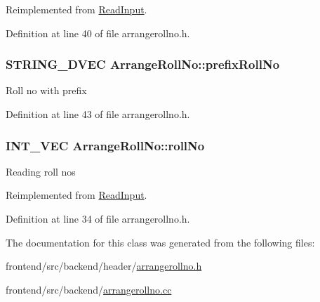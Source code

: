 \-Reimplemented from \hyperlink{classReadInput_a6a96c934f8c9a2a2056dc50505017e52}{\-Read\-Input}.



\-Definition at line 40 of file arrangerollno.\-h.

\hypertarget{classArrangeRollNo_aa0401159b5d59c7afe77980a391a9a0a}{
\subsubsection[{prefix\-Roll\-No}]{\setlength{\rightskip}{0pt plus 5cm}\-S\-T\-R\-I\-N\-G\-\_\-D\-V\-E\-C {\bf \-Arrange\-Roll\-No\-::prefix\-Roll\-No}}}\label{classArrangeRollNo_aa0401159b5d59c7afe77980a391a9a0a}
\-Roll no with prefix 

\-Definition at line 43 of file arrangerollno.\-h.

\hypertarget{classArrangeRollNo_ad75d3ee3f709606da5b4871098c3e978}{
\subsubsection[{roll\-No}]{\setlength{\rightskip}{0pt plus 5cm}\-I\-N\-T\-\_\-\-V\-E\-C {\bf \-Arrange\-Roll\-No\-::roll\-No}}}\label{classArrangeRollNo_ad75d3ee3f709606da5b4871098c3e978}
\-Reading roll nos 

\-Reimplemented from \hyperlink{classReadInput_a862fbffdffa56fc6d66b1d1f14dae087}{\-Read\-Input}.



\-Definition at line 34 of file arrangerollno.\-h.



\-The documentation for this class was generated from the following files\-:\begin{DoxyCompactItemize}
\item 
frontend/src/backend/header/\hyperlink{arrangerollno_8h}{arrangerollno.\-h}\item 
frontend/src/backend/\hyperlink{arrangerollno_8cc}{arrangerollno.\-cc}\end{DoxyCompactItemize}
